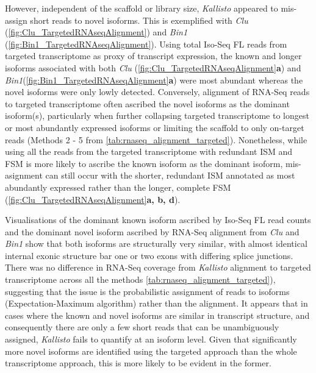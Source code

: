 However, independent of the scaffold or library size, \textit{Kallisto} appeared to mis-assign short reads to novel isoforms. This is exemplified with \textit{Clu} (\cref{fig:Clu_TargetedRNAseqAlignment}) and \textit{Bin1} (\cref{fig:Bin1_TargetedRNAseqAlignment}).   Using total Iso-Seq FL reads from targeted transcriptome as proxy of transcript expression, the known and longer isoforms associated with both \textit{Clu} (\cref{fig:Clu_TargetedRNAseqAlignment}\textbf{a}) and \textit{Bin1}(\cref{fig:Bin1_TargetedRNAseqAlignment}\textbf{a}) were most abundant whereas the novel isoforms were only lowly detected. Conversely, alignment of RNA-Seq reads to targeted transcriptome often ascribed the novel isoforms as the dominant isoform(s), particularly when further collapsing targeted transcriptome to longest or most abundantly expressed isoforms or limiting the scaffold to only on-target reads (Methods 2 - 5 from \cref{tab:rnaseq_alignment_targeted}). Nonetheless, while using all the reads from the targeted transcriptome with redundant ISM and FSM is more likely to ascribe the known isoform as the dominant isoform, mis-asignment can still occur with the shorter, redundant ISM annotated as most abundantly expressed rather than the longer, complete FSM (\cref{fig:Clu_TargetedRNAseqAlignment}\textbf{a, b, d}).

Visualisations of the dominant known isoform ascribed by Iso-Seq FL read counts and the dominant novel isoform ascribed by RNA-Seq alignment from \textit{Clu} and \textit{Bin1} show that both isoforms are structurally very similar, with almost identical internal exonic structure bar one or two exons with differing splice junctions. There was no difference in RNA-Seq coverage from \textit{Kallisto} alignment to targeted transcriptome across all the methods \cref{tab:rnaseq_alignment_targeted}), suggesting that the issue is the probabilistic assignment of reads to isoforms (Expectation-Maximum algorithm) rather than the alignment. It appears that in cases where the known and novel isoforms are similar in transcript structure, and consequently there are only a few short reads that can be unambiguously assigned, \textit{Kallisto} fails to quantify at an isoform level. Given that significantly more novel isoforms are identified using the targeted approach than the whole transcriptome approach, this is more likely to be evident in the former.   


